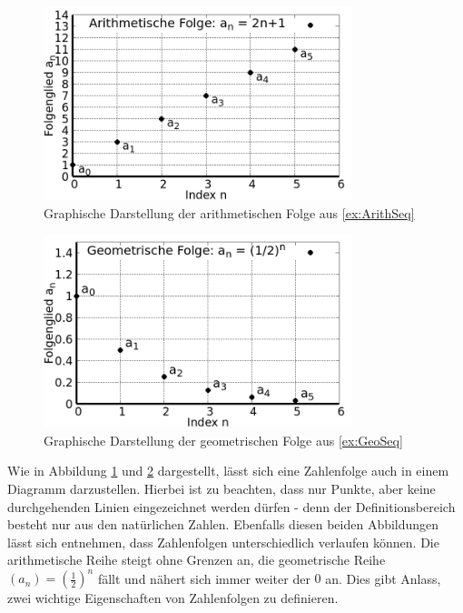\begin{figure}
	\centering
	\includegraphics[width=0.8\textwidth]{./gnuplot/example-arithmetic-series.png}
	\caption[Arithmetische Folge]{Graphische Darstellung der arithmetischen Folge aus \ref{ex:ArithSeq}}
	\label{fig:ExArithSeq}
\end{figure}

\begin{figure}
	\centering
	\includegraphics[width=0.8\textwidth]{./gnuplot/example-geometric-series.png}
	\caption[Geometrische Folge]{Graphische Darstellung der geometrischen Folge aus \ref{ex:GeoSeq}}
	\label{fig:ExGeoSeq}
\end{figure}

Wie in Abbildung \ref{fig:ExArithSeq} und \ref{fig:ExGeoSeq} dargestellt, lässt sich eine Zahlenfolge auch in einem Diagramm darzustellen. Hierbei ist zu beachten, dass nur Punkte, aber keine durchgehenden Linien eingezeichnet werden dürfen - denn der Definitionsbereich besteht nur aus den natürlichen Zahlen. Ebenfalls diesen beiden Abbildungen lässt sich entnehmen, dass Zahlenfolgen unterschiedlich verlaufen können. Die arithmetische Reihe steigt ohne Grenzen an, die geometrische Reihe $(a_n) = (\frac{1}{2})^n$ fällt und nähert sich immer weiter der $0$ an. Dies gibt Anlass, zwei wichtige Eigenschaften von Zahlenfolgen zu definieren.

